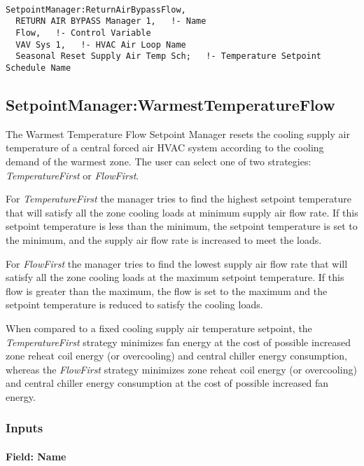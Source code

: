 \begin{lstlisting}

SetpointManager:ReturnAirBypassFlow,
  RETURN AIR BYPASS Manager 1,   !- Name
  Flow,   !- Control Variable
  VAV Sys 1,   !- HVAC Air Loop Name
  Seasonal Reset Supply Air Temp Sch;   !- Temperature Setpoint Schedule Name
\end{lstlisting}

\subsection{SetpointManager:WarmestTemperatureFlow}\label{setpointmanagerwarmesttemperatureflow}

The Warmest Temperature Flow Setpoint Manager resets the cooling supply air temperature of a central forced air HVAC system according to the cooling demand of the warmest zone. The user can select one of two strategies: \emph{TemperatureFirst} or \emph{FlowFirst}.

For \emph{TemperatureFirst} the manager tries to find the highest setpoint temperature that will satisfy all the zone cooling loads at minimum supply air flow rate. If this setpoint temperature is less than the minimum, the setpoint temperature is set to the minimum, and the supply air flow rate is increased to meet the loads.

For \emph{FlowFirst} the manager tries to find the lowest supply air flow rate that will satisfy all the zone cooling loads at the maximum setpoint temperature. If this flow is greater than the maximum, the flow is set to the maximum and the setpoint temperature is reduced to satisfy the cooling loads.

When compared to a fixed cooling supply air temperature setpoint, the \emph{TemperatureFirst} strategy minimizes fan energy at the cost of possible increased zone reheat coil energy (or overcooling) and central chiller energy consumption, whereas the \emph{FlowFirst} strategy minimizes zone reheat coil energy (or overcooling) and central chiller energy consumption at the cost of possible increased fan energy.

\subsubsection{Inputs}\label{inputs-13-013}

\paragraph{Field: Name}\label{field-name-13-009}

